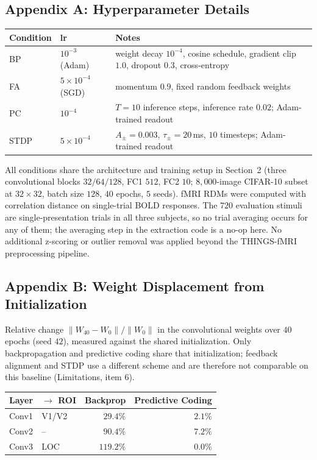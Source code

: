 \documentclass[10pt,twocolumn]{article}
\begin{document}
\subsection*{Appendix A: Hyperparameter Details}
\begingroup
\footnotesize
\begin{tabular}{@{}llp{3.3cm}@{}}
\toprule
Condition & lr & Notes \\
\midrule
BP & $10^{-3}$ (Adam) & weight decay $10^{-4}$, cosine schedule, gradient clip $1.0$, dropout $0.3$, cross-entropy \\
FA & $5\times10^{-4}$ (SGD) & momentum $0.9$, fixed random feedback weights \\
PC & $10^{-4}$ & $T=10$ inference steps, inference rate $0.02$; Adam-trained readout \\
STDP & $5\times10^{-4}$ & $A_\pm=0.003$, $\tau_\pm=20$\,ms, $10$ timesteps; Adam-trained readout \\
\bottomrule
\end{tabular}
\endgroup

\noindent All conditions share the architecture and training setup in Section~2 (three convolutional blocks $32/64/128$, FC1 $512$, FC2 $10$; $8{,}000$-image CIFAR-10 subset at $32\times32$, batch size $128$, $40$ epochs, $5$ seeds). fMRI RDMs were computed with correlation distance on single-trial BOLD responses. The $720$ evaluation stimuli are single-presentation trials in all three subjects, so no trial averaging occurs for any of them; the averaging step in the extraction code is a no-op here. No additional z-scoring or outlier removal was applied beyond the THINGS-fMRI preprocessing pipeline.

\subsection*{Appendix B: Weight Displacement from Initialization}

\noindent Relative change $\lVert W_{40} - W_{0}\rVert / \lVert W_{0}\rVert$ in the convolutional weights over $40$ epochs (seed $42$), measured against the shared initialization. Only backpropagation and predictive coding share that initialization; feedback alignment and STDP use a different scheme and are therefore not comparable on this baseline (Limitations, item 6).

\begingroup
\footnotesize
\begin{tabular}{@{}llrr@{}}
\toprule
Layer & $\to$ ROI & Backprop & Predictive Coding \\
\midrule
Conv1 & V1/V2 & $29.4\%$ & $2.1\%$ \\
Conv2 & --    & $90.4\%$ & $7.2\%$ \\
Conv3 & LOC   & $119.2\%$ & $0.0\%$ \\
\bottomrule
\end{tabular}
\endgroup
\end{document}
